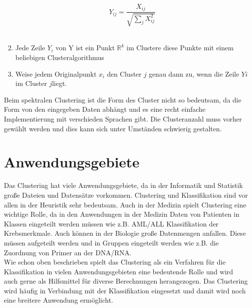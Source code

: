 \begin{enumerate}
	\[Y_{ij} = \frac{X_{ij}}{\sqrt{ \sum_{j} X_{ij}^2}}\]\\
	
	\item Jede Zeile \(Y_i\) von Y ist ein Punkt \(\mathbb{R}^k\) im Clustere diese Punkte mit einem beliebigen Clusteralgorithmus\\
	
	\item Weise jedem Originalpunkt \(x_i\) den Cluster \(j\) genau dann zu, wenn die Zeile \(Yi\) im Cluster \(j\)liegt.\\
	
\end{enumerate}
\cite{fay}

Beim spektralen Clustering ist die Form des Cluster nicht so bedeutsam, da die Form von den eingegeben Daten abhängt und es eine recht einfache Implementierung mit verschieden Sprachen gibt. Die Clusteranzahl muss vorher gewählt werden und dies kann sich unter Umständen schwierig gestalten.\\   \cite{fasulo99,mitch97,alp95}
\section{Anwendungsgebiete}
Das Clustering hat viele Anwendungsgebiete, da in der Informatik und Statistik große Dateien und Datensätze vorkommen. Clustering und Klassifikation sind vor allen in der Heuristik sehr bedeutsam. Auch in der Medizin spielt Clustering eine wichtige Rolle, da in den Anwendungen in der Medizin Daten von Patienten in Klassen eingeteilt werden müssen wie z.B. AML/ALL Klassifikation der Krebsmerkmale. Auch können in der Biologie große Datenmengen anfallen. Diese müssen aufgeteilt werden und in Gruppen eingeteilt werden wie z.B. die Zuordnung von Primer an der DNA/RNA.\cite{fay} \\ 
Wie schon oben beschrieben spielt das Clustering als ein Verfahren für die Klassifikation in vielen Anwendungsgebieten eine bedeutende Rolle und wird auch gerne als Hilfsmittel für diverse Berechnungen herangezogen. Das Clustering wird häufig in Verbindung mit der Klassifikation eingesetzt und damit wird noch eine breitere Anwendung ermöglicht. \cite{fay}

